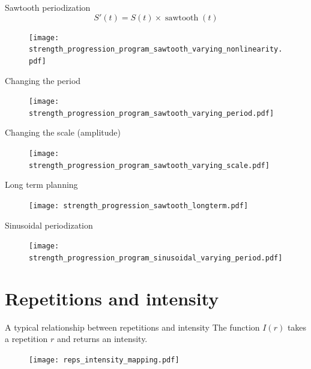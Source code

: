 \documentclass[11pt, aspectratio=149]{beamer}
\theoremstyle{plain}
\begin{document}
\begin{frame}[fragile, t]{Sawtooth periodization}
	\vfill
	\begin{equation*}
S'( t) = S( t) \times \operatorname{sawtooth}(t)
\end{equation*}
	\vfill
	\begin{figure}
		\centering
		\texttt{[image: strength\_progression\_program\_sawtooth\_varying\_nonlinearity.pdf]}
	\end{figure}
	\vfill
\end{frame}


\begin{frame}[fragile, t]{Changing the period}
	\vfill
	\begin{figure}
		\centering
		\texttt{[image: strength\_progression\_program\_sawtooth\_varying\_period.pdf]}
	\end{figure}
	\vfill
\end{frame}

\begin{frame}[fragile, t]{Changing the scale (amplitude)}
	\vfill
	\begin{figure}
		\centering
		\texttt{[image: strength\_progression\_program\_sawtooth\_varying\_scale.pdf]}
	\end{figure}
	\vfill
\end{frame}

\begin{frame}[fragile, t]{Long term planning}
	\vfill
	\begin{figure}
		\centering
		\texttt{[image: strength\_progression\_sawtooth\_longterm.pdf]}
	\end{figure}
	\vfill
\end{frame}


\begin{frame}[fragile, t]{Sinusoidal periodization}
	\vfill
	\begin{figure}
		\centering
		\texttt{[image: strength\_progression\_program\_sinusoidal\_varying\_period.pdf]}
	\end{figure}
	\vfill
\end{frame}

\section{Repetitions and intensity}


\begin{frame}[fragile, t]{A typical relationship between repetitions and intensity}
	\vfill
	The function $I(r)$ takes a repetition $r$ and returns an intensity.
	\vfill
	\begin{figure}
		\centering
		\texttt{[image: reps\_intensity\_mapping.pdf]}
	\end{figure}
	\vfill
\end{frame}
\end{document}

